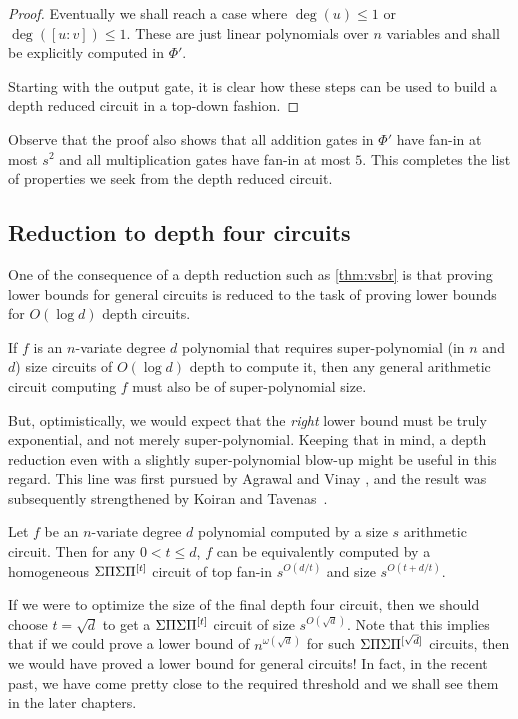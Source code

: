 \begin{proof}
  Eventually we shall reach a case where $\deg(u)\leq 1$ or $\deg([u:v])
  \leq 1$. 
These are just linear polynomials over $n$ variables and
  shall be explicitly computed in $\Phi'$.

  Starting with the output gate, it is clear how these steps can be
  used to build a depth reduced circuit in a top-down fashion.
\end{proof}

Observe that the proof also shows that all addition gates in $\Phi'$
have fan-in at most $s^2$ and all multiplication gates have fan-in at
most $5$. 
This completes the list of properties we seek from the depth
reduced circuit.


\subsection{Reduction to depth four circuits}

One of the consequence of a depth reduction such as \autoref{thm:vsbr} is that proving lower bounds for general circuits is reduced to the task of proving lower bounds for $O(\log d)$ depth circuits. 

\begin{corollary}\label{cor:vsbr-contra}
If $f$ is an $n$-variate degree $d$ polynomial that requires super-polynomial (in $n$ and $d$) size circuits of $O(\log d)$ depth to compute it, then any general arithmetic circuit computing $f$ must also be of super-polynomial size. 
\end{corollary}

But, optimistically, we would expect that the \emph{right} lower bound must be truly exponential, and not merely super-polynomial. 
Keeping that in mind, a depth reduction even with a slightly super-polynomial blow-up might be useful in this regard. 
This line was first pursued by Agrawal and Vinay \cite{av08}, and the result was subsequently strengthened by Koiran \cite{koiran} and Tavenas~\cite{Tav13}. 

\begin{theorem} \label{thm:av}
Let $f$ be an $n$-variate degree $d$ polynomial computed by a size $s$ arithmetic circuit. 
Then for any $0< t \leq d$, $f$ can be equivalently computed by a homogeneous $\Sigma\Pi\Sigma\Pi^{[t]}$ circuit of top fan-in $s^{O(d/t)}$ and size $s^{O(t + d/t)}$. 
\end{theorem}

If we were to optimize the size of the final depth four circuit, then we should choose $t = \sqrt{d}$ to get a $\Sigma\Pi\Sigma\Pi^{[t]}$ circuit of size $s^{O(\sqrt{d})}$. 
Note that this implies that if we could prove a lower bound of $n^{\omega(\sqrt{d})}$ for such $\Sigma\Pi\Sigma\Pi^{[\sqrt{d}]}$ circuits, then we would have proved a lower bound for general circuits! 
In fact, in the recent past, we have come pretty close to the required threshold and we shall see them in the later chapters. \\

